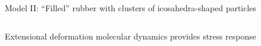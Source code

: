 \documentclass[aspectratio=169,xcolor=table]{beamer}
\begin{document}
\begin{frame}[c]{Model II: ``Filled'' rubber with clusters of icosahedra-shaped particles}
\begin{columns}[T]
{\begin{columns}[c]
    \end{columns}
    }
  \end{columns}
\end{frame}

\begin{frame}[c]{Extensional deformation molecular dynamics provides stress response}
  \begin{columns}[c]

  \centering


  \vspace{1.0\baselineskip}


  \centering

  \vspace{\baselineskip}


\end{columns}
\end{frame}
\end{document}
